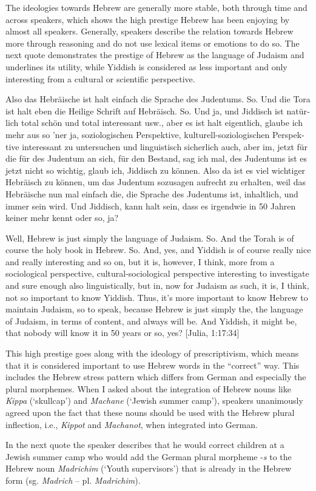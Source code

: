 \documentclass[output=paper]{langscibook}
\begin{document}
The ideologies towards Hebrew are generally more stable, both through time and across speakers, which shows the high prestige Hebrew has been enjoying by almost all speakers. Generally, speakers describe the relation towards Hebrew more through reasoning and do not use lexical items or emotions to do so. The next quote demonstrates the prestige of Hebrew as the language of Judaism and underlines its utility, while Yiddish is considered as less important and only interesting from a cultural or scientific perspective.

\ea%
\label{ex:jahns:6}
\begin{otherlanguage}{ngerman}
Also das Hebräische ist halt einfach die Sprache des Judentums. So. Und die Tora ist halt eben die Heilige Schrift auf Hebräisch. So. Und ja, und Jiddisch ist natürlich total schön und total interessant usw., aber es ist halt eigentlich, glaube ich mehr aus so 'ner ja, soziologischen Perspektive, kulturell-soziologischen Perspektive interessant zu untersuchen und linguistisch sicherlich auch, aber im, jetzt für die für des Judentum an sich, für den Bestand, sag ich mal, des Judentums ist es jetzt nicht so wichtig, glaub ich, Jiddisch zu können. Also da ist es viel wichtiger Hebräisch zu können, um das Judentum sozusagen aufrecht zu erhalten, weil das Hebräische nun mal einfach die, die Sprache des Judentums ist, inhaltlich, und immer sein wird. Und Jiddisch, kann halt sein, dass es irgendwie in 50 Jahren keiner mehr kennt oder so, ja? 
\end{otherlanguage}

Well, Hebrew is just simply the language of Judaism. So. And the Torah is of course the holy book in Hebrew. So. And, yes, and Yiddish is of course really nice and really interesting and so on, but it is, however, I think, more from a sociological perspective, cultural-sociological perspective interesting to investigate and sure enough also linguistically, but in, now for Judaism as such, it is, I think, not so important to know Yiddish. Thus, it’s more important to know Hebrew to maintain Judaism, so to speak, because Hebrew is just simply the, the language of Judaism, in terms of content, and always will be. And Yiddish, it might be, that nobody will know it in 50 years or so, yes? [Julia, 1:17:34]
\z

\begin{sloppypar}
This high prestige goes along with the ideology of prescriptivism, which means that it is considered important to use Hebrew words in the “correct” way. This includes the Hebrew stress pattern which differs from German and especially the plural morphemes. When I asked about the integration of Hebrew nouns like \textit{Kippa} (‘skullcap’) and \textit{Machane} (‘Jewish summer camp’), speakers unanimously agreed upon the fact that these nouns should be used with the Hebrew plural inflection, i.e., \textit{Kippot} and \textit{Machanot}, when integrated into German.
\end{sloppypar}
In the next quote the speaker describes that he would correct children at a Jewish summer camp who would add the German plural morpheme -\textit{s} to the Hebrew noun \textit{Madrichim} (‘Youth supervisors’) that is already in the Hebrew form (sg. \textit{Madrich} – pl. \textit{Madrichim}).
\end{document}
